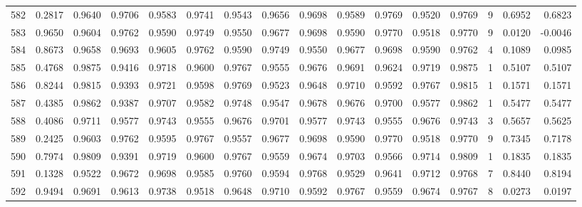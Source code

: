 \begin{tabular}{lrrrrrrrrrrrrrrr}
582 &      0.2817 &  0.9640 &  0.9706 &  0.9583 &  0.9741 &  0.9543 &  0.9656 &  0.9698 &  0.9589 &  0.9769 &   0.9520 &     0.9769 &      9 &                    0.6952 &                     0.6823 \\
583 &      0.9650 &  0.9604 &  0.9762 &  0.9590 &  0.9749 &  0.9550 &  0.9677 &  0.9698 &  0.9590 &  0.9770 &   0.9518 &     0.9770 &      9 &                    0.0120 &                    -0.0046 \\
584 &      0.8673 &  0.9658 &  0.9693 &  0.9605 &  0.9762 &  0.9590 &  0.9749 &  0.9550 &  0.9677 &  0.9698 &   0.9590 &     0.9762 &      4 &                    0.1089 &                     0.0985 \\
585 &      0.4768 &  0.9875 &  0.9416 &  0.9718 &  0.9600 &  0.9767 &  0.9555 &  0.9676 &  0.9691 &  0.9624 &   0.9719 &     0.9875 &      1 &                    0.5107 &                     0.5107 \\
586 &      0.8244 &  0.9815 &  0.9393 &  0.9721 &  0.9598 &  0.9769 &  0.9523 &  0.9648 &  0.9710 &  0.9592 &   0.9767 &     0.9815 &      1 &                    0.1571 &                     0.1571 \\
587 &      0.4385 &  0.9862 &  0.9387 &  0.9707 &  0.9582 &  0.9748 &  0.9547 &  0.9678 &  0.9676 &  0.9700 &   0.9577 &     0.9862 &      1 &                    0.5477 &                     0.5477 \\
588 &      0.4086 &  0.9711 &  0.9577 &  0.9743 &  0.9555 &  0.9676 &  0.9701 &  0.9577 &  0.9743 &  0.9555 &   0.9676 &     0.9743 &      3 &                    0.5657 &                     0.5625 \\
589 &      0.2425 &  0.9603 &  0.9762 &  0.9595 &  0.9767 &  0.9557 &  0.9677 &  0.9698 &  0.9590 &  0.9770 &   0.9518 &     0.9770 &      9 &                    0.7345 &                     0.7178 \\
590 &      0.7974 &  0.9809 &  0.9391 &  0.9719 &  0.9600 &  0.9767 &  0.9559 &  0.9674 &  0.9703 &  0.9566 &   0.9714 &     0.9809 &      1 &                    0.1835 &                     0.1835 \\
591 &      0.1328 &  0.9522 &  0.9672 &  0.9698 &  0.9585 &  0.9760 &  0.9594 &  0.9768 &  0.9529 &  0.9641 &   0.9712 &     0.9768 &      7 &                    0.8440 &                     0.8194 \\
592 &      0.9494 &  0.9691 &  0.9613 &  0.9738 &  0.9518 &  0.9648 &  0.9710 &  0.9592 &  0.9767 &  0.9559 &   0.9674 &     0.9767 &      8 &                    0.0273 &                     0.0197 \\

\end{tabular}
